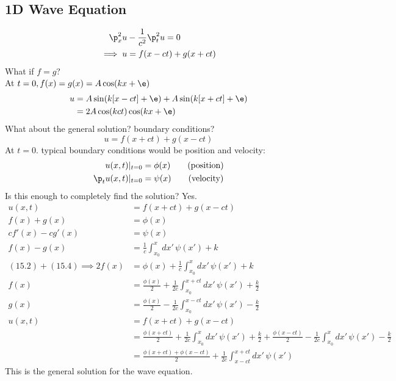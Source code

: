 \documentclass[Maths.tex]{subfiles}
\begin{document}
\section{1D Wave Equation}
\begin{align}
	\p_x^2u &- \frac{1}{c^2}\p_t^2u = 0 \\
	\implies u &= f(x - ct) + g(x + ct)
\end{align}
What if $f = g$? \\
At $t=0, f(x) = g(x) = A\cos(kx + \e)$
\begin{align}
	u &= A\sin(k[x - ct] + \e) + A\sin(k[x + ct] + \e) \\
	  &= 2A\cos(kct)\cos(kx + \e)
\end{align}
What about the general solution? boundary conditions?
\begin{equation}
	u = f(x + ct) + g(x - ct)
\end{equation}
At $t=0$. typical boundary conditions would be position and velocity:
\begin{align}
	u(x,t)|_{t=0} &= \phi(x) \tag{position} \\
	\p_tu(x,t)|_{t=0} &= \psi(x) \tag{velocity}
\end{align}
Is this enough to completely find the solution? Yes.
\begin{align}
	u(x,t) &= f(x+ct) + g(x-ct) \\
	f(x) + g(x) &= \phi(x) \\
	cf'(x) - cg'(x) &= \psi(x) \\
	f(x) - g(x) &= \frac{1}{c}\int_{x_0}^x dx' \,\psi(x') + k \\
	(15.2) + (15.4) \implies 2f(x) &= \phi(x) + \frac{1}{c}\int_{x_0}^x dx'\,\psi(x') + k \\
	f(x) &= \frac{\phi(x)}{2} + \frac{1}{2c}\int_{x_0}^{x+ct} dx'\,\psi(x') + \frac{k}{2} \\
	g(x) &= \frac{\phi(x)}{2} - \frac{1}{2c}\int_{x_0}^{x-ct} dx'\,\psi(x') - \frac{k}{2} \\
	u(x,t) &= f(x+ct) + g(x-ct) \\
		   &= \frac{\phi(x+ct)}{2} + \frac{1}{2c}\int_{x_0}^x dx'\,\psi(x') + \frac{k}{2} + \frac{\phi(x-ct)}{2} - \frac{1}{2c}\int_{x_0}^x dx'\,\psi(x') - \frac{k}{2} \\
		   &= \frac{\phi(x+ct)+\phi(x-ct)}{2} + \frac{1}{2c}\int_{x-ct}^{x+ct} dx'\,\psi(x')
\end{align}
This is the general solution for the wave equation.

\chapter{}
\end{document}
